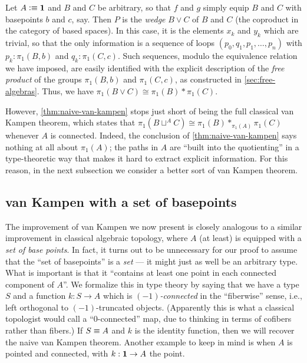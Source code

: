 \begin{eg}\label{eg:wedge}
  Let $A\vcentcolon\equiv\mathbf{1}$ and $B$ and $C$ be arbitrary, so that $f$ and $g$ simply equip $B$ and $C$ with basepoints $b$ and $c$, say.
  Then $P$ is the \emph{wedge} $B\vee C$ of $B$ and $C$ (the coproduct in the category of based spaces).
  In this case, it is the elements $x_k$ and $y_k$ which are trivial, so that the only information is a sequence of loops $(p_0,q_1,p_1,\dots,p_n)$ with $p_k:\pi_1(B,b)$ and $q_k:\pi_1(C,c)$.
  Such sequences, modulo the equivalence relation we have imposed, are easily identified with the explicit description of the \emph{free product} of the groups $\pi_1(B,b)$ and $\pi_1(C,c)$, as constructed in \autoref{sec:free-algebras}.
  Thus, we have $\pi_1(B\vee C) \cong \pi_1(B) * \pi_1(C)$.
\end{eg}

However, \autoref{thm:naive-van-kampen} stops just short of being the full classical van Kampen theorem, which states that $\pi_1(B\sqcup^A C) \cong \pi_1(B) *_{\pi_1(A)} \pi_1(C)$ whenever $A$ is connected.
Indeed, the conclusion of \autoref{thm:naive-van-kampen} says nothing at all about $\pi_1(A)$; the paths in $A$ are ``built into the quotienting'' in a type-theoretic way that makes it hard to extract explicit information.
For this reason, in the next subsection we consider a better sort of van Kampen theorem.


\subsection{van Kampen with a set of basepoints}
\label{sec:better-vankampen}

The improvement of van Kampen we now present is closely analogous to a similar improvement in classical algebraic topology, where $A$ (at least) is equipped with a \emph{set of base points}.
In fact, it turns out to be unnecessary for our proof to assume that the ``set of basepoints'' is a \emph{set} --- it might just as well be an arbitrary type.
What is important is that it ``contains at least one point in each connected component of $A$''.
We formalize this in type theory by saying that we have a type $S$ and a function $k:S \to A$ which is \emph{$(-1)$-connected} in the ``fiberwise'' sense, i.e., left orthogonal to $(-1)$-truncated objects.
(Apparently this is what a classical topologist would call a ``$0$-connected'' map, due to thinking in terms of cofibers rather than fibers.)
If $S\equiv A$ and $k$ is the identity function, then we will recover the naive van Kampen theorem.
Another example to keep in mind is when $A$ is pointed and connected, with $k:\mathbf{1}\to A$ the point.

